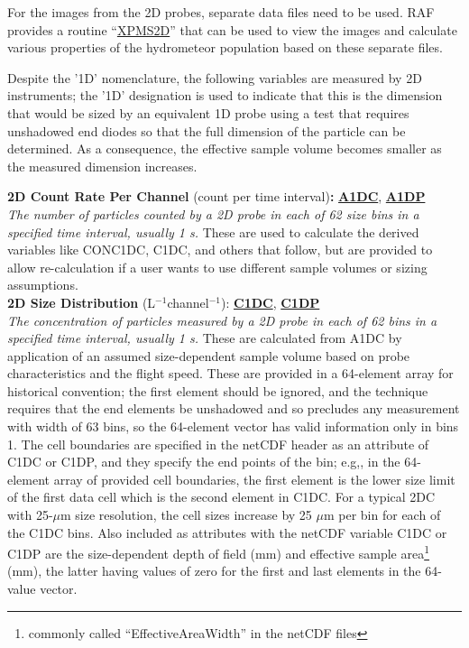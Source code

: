 For the images from the 2D probes, separate data files need to be
used. RAF provides a routine ``\href{https://www.eol.ucar.edu/software/xpms2d}{XPMS2D}''
that can be used to view the images and calculate various properties
of the hydrometeor population based on these separate  files.

\label{Despite-the-'1D'}Despite the '1D' nomenclature, the following
variables are measured by 2D instruments; the '1D' designation is
used to indicate that this is the dimension that would be sized by
an equivalent 1D probe using a test that requires unshadowed end diodes
so that the full dimension of the particle can be determined. As a
consequence, the effective sample volume becomes smaller as the measured
dimension increases.
\begin{hangparagraphs}
\textbf{2D Count Rate Per Channel }(count per time interval)\textbf{:
}\textbf{\uline{A1DC}}, \textbf{\uline{A1DP}}\\
\emph{The number of particles counted by a 2D
probe in each of 62 size bins in a specified time interval, usually
1 s.} These are used to calculate the derived variables like CONC1DC,
C1DC, and others that follow, but are provided to allow re-calculation
if a user wants to use different sample volumes or sizing assumptions.\\

\textbf{2D Size Distribution }(L$^{-1}$channel$^{-1}$):\textbf{
}\textbf{\uline{C1DC}}, \textbf{\uline{C1DP}}\\
\emph{The concentration of particles
measured by a 2D probe in each of 62 bins in a specified time interval,
usually 1 s.} These are calculated from A1DC by application of an
assumed size-dependent sample volume based on probe characteristics
and the flight speed. These are provided in a 64-element array for
historical convention; the first element should be ignored, and the
technique requires that the end elements be unshadowed and so precludes
any measurement with width of 63 bins, so the 64-element vector has
valid information only in bins 1. The cell boundaries
are specified in the netCDF header as an attribute of C1DC or C1DP,
and they specify the end points of the bin; e.g,, in the 64-element
array of provided cell boundaries, the first element is the lower
size limit of the first data cell which is the second element in C1DC.
For a typical 2DC with 25-$\mu$m size resolution, the cell sizes
increase by 25 $\mu$m per bin for each of the C1DC bins. Also included
as attributes with the netCDF variable C1DC or C1DP are the size-dependent
depth of field (mm) and effective sample area\footnote{commonly called ``EffectiveAreaWidth'' in the netCDF files}
(mm), the latter having values of zero for the first and last elements
in the 64-value vector. \\


\end{hangparagraphs}
